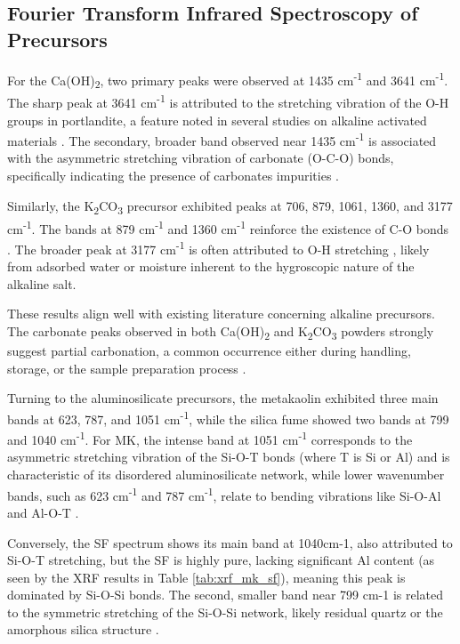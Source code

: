 \subsection{Fourier Transform Infrared Spectroscopy of Precursors}

 For the Ca(OH)\textsubscript{2}, two primary peaks were observed at 1435 cm\textsuperscript{-1} and 3641 cm\textsuperscript{-1}.
 The sharp peak at 3641 cm\textsuperscript{-1} is attributed to the stretching vibration of the O-H groups in portlandite, a feature noted in several studies on alkaline activated materials \cite{batista2025mgosio2}.
 The secondary, broader band observed near 1435 cm\textsuperscript{-1} is associated with the asymmetric stretching vibration of carbonate (O-C-O) bonds, specifically indicating the presence of carbonates impurities \cite{Zhao2023}.

 Similarly, the K\textsubscript{2}CO\textsubscript{3} precursor exhibited peaks at 706, 879, 1061, 1360, and 3177 cm\textsuperscript{-1}. The bands at 879 cm\textsuperscript{-1} and 1360 cm\textsuperscript{-1} reinforce the existence of C-O bonds \cite{moraes2024scsa}.
 The broader peak at 3177 cm\textsuperscript{-1} is often attributed to O-H stretching \cite{Brito2008}, likely from adsorbed water or moisture inherent to the hygroscopic nature of the alkaline salt.

 These results align well with existing literature concerning alkaline precursors. The carbonate peaks observed in both Ca(OH)\textsubscript{2} and K\textsubscript{2}CO\textsubscript{3} powders strongly suggest partial carbonation, a common occurrence either during handling, storage, or the sample preparation process \cite{Lei2021}.

 Turning to the aluminosilicate precursors, the metakaolin exhibited three main bands at 623, 787, and 1051 cm\textsuperscript{-1}, while the silica fume showed two bands at 799 and 1040 cm\textsuperscript{-1}.
 For MK, the intense band at 1051 cm\textsuperscript{-1} corresponds to the asymmetric stretching vibration of the Si-O-T bonds (where T is Si or Al) and is characteristic of its disordered aluminosilicate network, while lower wavenumber bands, such as 623 cm\textsuperscript{-1} and 787 cm\textsuperscript{-1}, relate to bending vibrations like Si-O-Al and Al-O-T \cite{moraes2024scsa}.

 Conversely, the SF spectrum shows its main band at 1040cm-1, also attributed to Si-O-T stretching, but the SF is highly pure, lacking significant Al content (as seen by the XRF results in Table \ref{tab:xrf_mk_sf}), meaning this peak is dominated by Si-O-Si bonds. The second, smaller band near 799 cm-1 is related to the symmetric stretching of the Si-O-Si network, likely residual quartz or the amorphous silica structure \cite{ma2022calcium}.

